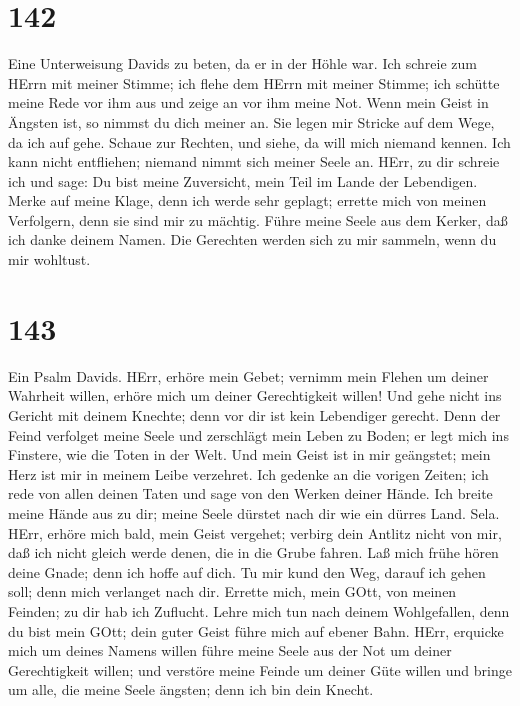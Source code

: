 \hypertarget{section-141}{%
\section{142}\label{section-141}}

 Eine Unterweisung Davids zu beten, da er in der Höhle war.
 Ich schreie zum HErrn mit meiner Stimme; ich flehe dem
HErrn mit meiner Stimme;  ich schütte meine Rede vor ihm aus
und zeige an vor ihm meine Not.  Wenn mein Geist in Ängsten
ist, so nimmst du dich meiner an. Sie legen mir Stricke auf dem Wege, da
ich auf gehe.  Schaue zur Rechten, und siehe, da will mich
niemand kennen. Ich kann nicht entfliehen; niemand nimmt sich meiner
Seele an.  HErr, zu dir schreie ich und sage: Du bist meine
Zuversicht, mein Teil im Lande der Lebendigen.  Merke auf
meine Klage, denn ich werde sehr geplagt; errette mich von meinen
Verfolgern, denn sie sind mir zu mächtig.  Führe meine Seele
aus dem Kerker, daß ich danke deinem Namen. Die Gerechten werden sich zu
mir sammeln, wenn du mir wohltust.

\hypertarget{section-142}{%
\section{143}\label{section-142}}

 Ein Psalm Davids. HErr, erhöre mein Gebet; vernimm mein
Flehen um deiner Wahrheit willen, erhöre mich um deiner Gerechtigkeit
willen!  Und gehe nicht ins Gericht mit deinem Knechte; denn
vor dir ist kein Lebendiger gerecht.  Denn der Feind
verfolget meine Seele und zerschlägt mein Leben zu Boden; er legt mich
ins Finstere, wie die Toten in der Welt.  Und mein Geist ist
in mir geängstet; mein Herz ist mir in meinem Leibe verzehret.
 Ich gedenke an die vorigen Zeiten; ich rede von allen
deinen Taten und sage von den Werken deiner Hände.  Ich
breite meine Hände aus zu dir; meine Seele dürstet nach dir wie ein
dürres Land. Sela.  HErr, erhöre mich bald, mein Geist
vergehet; verbirg dein Antlitz nicht von mir, daß ich nicht gleich werde
denen, die in die Grube fahren.  Laß mich frühe hören deine
Gnade; denn ich hoffe auf dich. Tu mir kund den Weg, darauf ich gehen
soll; denn mich verlanget nach dir.  Errette mich, mein
GOtt, von meinen Feinden; zu dir hab ich Zuflucht.  Lehre
mich tun nach deinem Wohlgefallen, denn du bist mein GOtt; dein guter
Geist führe mich auf ebener Bahn.  HErr, erquicke mich um
deines Namens willen führe meine Seele aus der Not um deiner
Gerechtigkeit willen;  und verstöre meine Feinde um deiner
Güte willen und bringe um alle, die meine Seele ängsten; denn ich bin
dein Knecht.

